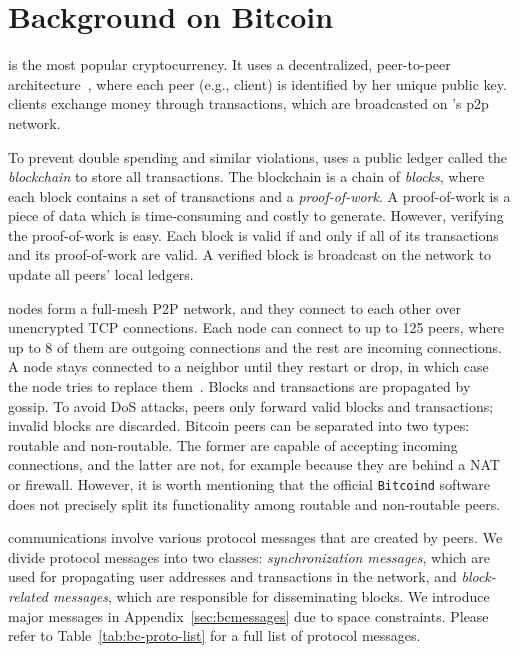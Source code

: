  \section{Background on Bitcoin}
\bc is the most popular cryptocurrency. It uses  a decentralized, peer-to-peer architecture~\cite{nakamoto2008bitcoin}, where each peer (e.g., client) is identified by her unique public key.  
	\bc clients exchange money through \bc transactions, which are  broadcasted on \bc's p2p network. 

	To prevent double spending and similar violations, \bc uses a public ledger called the \emph{blockchain} to store all \bc transactions. The blockchain is a chain of \emph{blocks}, where  each block contains a set of transactions and a \textit{proof-of-work}. A proof-of-work is a piece of data which is time-consuming and costly to generate. However, verifying the proof-of-work is easy. Each block is valid if and only if all of its transactions and its proof-of-work are valid. A verified block is broadcast on the network to update all peers' local ledgers. 
	
	\bc nodes form a full-mesh P2P network, and they connect to each other over unencrypted TCP connections. 
	Each node can connect to   up to 125 peers, where up to 8 of them are  outgoing connections and the rest are incoming connections. A node stays connected to a neighbor until they restart or drop, in which case the node tries to replace them~\cite{Bitcoinnetworkoverview}. 
	Blocks and transactions are propagated by gossip. To avoid DoS attacks, peers only forward valid blocks and transactions; invalid blocks are discarded. 
Bitcoin peers can be separated into two types: routable and non-routable. The former are capable of accepting incoming connections, and the latter are not, for example because they are behind a NAT or firewall. However, it is worth mentioning that the official {\tt Bitcoind} software does not precisely split its functionality among routable and non-routable peers. 

	 \bc   communications involve various protocol messages that are created by  \bc peers. 
	 We divide \bc protocol messages into two classes: \emph{synchronization messages},  which are used for  propagating user addresses and transactions in the \bc network, and \emph{block-related messages}, which are responsible for disseminating \bc blocks. We introduce  major \bc messages in  Appendix~\ref{sec:bcmessages} due to space constraints.
	Please refer to Table~\ref{tab:bc-proto-list} for a full list of \bc protocol messages.

